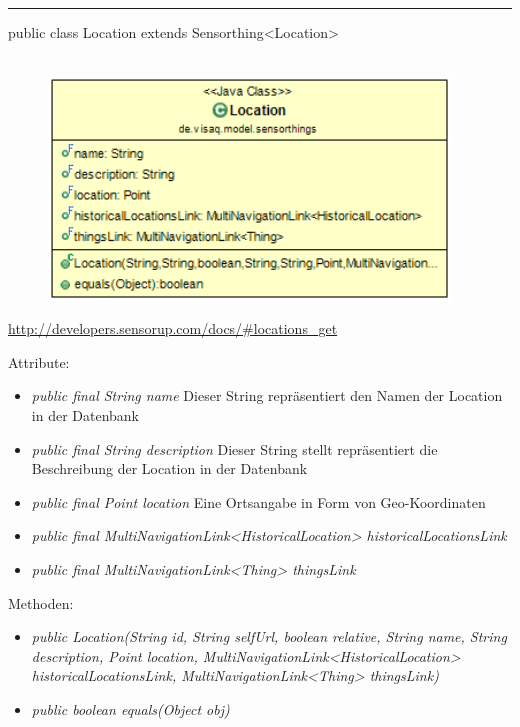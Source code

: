 \rule{\textwidth}{0.4pt}
public class Location extends Sensorthing<Location>
\\\\
\begin{minipage}{0.4\textwidth}
    \begin{figure}[H]
        {\centering\includegraphics[width=0.95\textwidth]{media/backend/modell/classes/Location.png}}
    \end{figure}
    \end{minipage} \hfill
\begin{minipage}{0.6\textwidth}
    \url{http://developers.sensorup.com/docs/#locations_get}
\end{minipage}

Attribute:
\begin{itemize}
    \item \emph{public final String name} Dieser String repräsentiert den Namen der Location in der Datenbank
    \item \emph{public final String description} Dieser String stellt repräsentiert die Beschreibung der Location in der Datenbank
    \item \emph{public final Point location} Eine Ortsangabe in Form von Geo-Koordinaten
    \item \emph{public final MultiNavigationLink<HistoricalLocation> historicalLocationsLink} 
    \item \emph{public final MultiNavigationLink<Thing> thingsLink} 
\end{itemize}
Methoden:
\begin{itemize}
    \item \emph{public Location(String id, String selfUrl, boolean relative, String name, String description, Point location, MultiNavigationLink<HistoricalLocation> historicalLocationsLink, MultiNavigationLink<Thing> thingsLink)}
    \item \emph{public boolean equals(Object obj)} 
\end{itemize}

